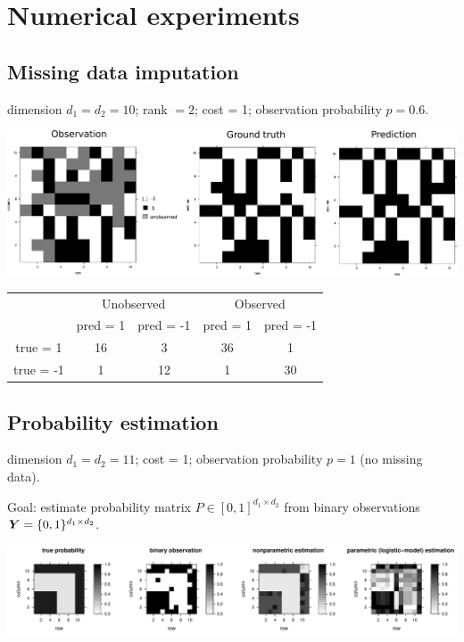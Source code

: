 \documentclass[11pt]{article}
\theoremstyle{plain}
\theoremstyle{definition}
\begin{document}
\section{Numerical experiments}
\subsection{Missing data imputation}
dimension $d_1=d_2=10$; rank $=2$; cost = 1; observation probability $p=0.6$.



\begin{center}
\includegraphics[width=15cm]{missing.pdf}
\end{center}

\begin{table}
\centering
\begin{tabular}{c|cc||cc}
&\multicolumn{2}{c||}{Unobserved} & \multicolumn{2}{c}{Observed}\\
&pred = 1&pred = -1&pred = 1&pred = -1\\
\hline
true = 1&16 & 3& 36&1 \\
true = -1&1 & 12&1 & 30
\end{tabular}
\end{table}

\subsection{Probability estimation}
dimension $d_1=d_2=11$; cost = 1; observation probability $p=1$ (no missing data). 

Goal: estimate probability matrix $P\in[0,1]^{d_1\times d_2}$ from binary observations $\bm Y=\{0,1\}^{d_1\times d_2}$. 


\begin{center}
\includegraphics[width=16cm]{est.pdf}
\end{center}
 
\end{document}
